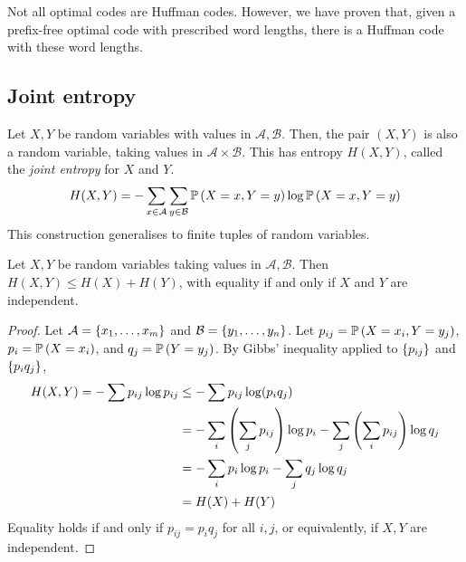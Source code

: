 \begin{remark}
    Not all optimal codes are Huffman codes.
    However, we have proven that, given a prefix-free optimal code with prescribed word lengths, there is a Huffman code with these word lengths.
\end{remark}

\subsection{Joint entropy}
Let \( X, Y \) be random variables with values in \( \mathcal A, \mathcal B \).
Then, the pair \( (X, Y) \) is also a random variable, taking values in \( \mathcal A \times \mathcal B \).
This has entropy \( H(X,Y) \), called the \emph{joint entropy} for \( X \) and \( Y \).
\[ H(X,Y) = - \sum_{x \in \mathcal A} \sum_{y \in \mathcal B} \mathbb{P}\left({X = x, Y = y}\right) \log \mathbb{P}\left({X = x, Y = y}\right) \]
This construction generalises to finite tuples of random variables.
\begin{lemma}
    Let \( X, Y \) be random variables taking values in \( \mathcal A, \mathcal B \).
    Then \( H(X,Y) \leq H(X) + H(Y) \), with equality if and only if \( X \) and \( Y \) are independent.
\end{lemma}
\begin{proof}
    Let \( \mathcal A = \qty{x_1, \dots, x_m} \) and \( \mathcal B = \qty{y_1, \dots, y_n} \).
    Let \( p_{ij} = \mathbb{P}\left({X = x_i, Y = y_j}\right) \), \( p_i = \mathbb{P}\left({X = x_i}\right) \), and \( q_j = \mathbb{P}\left({Y = y_j}\right) \).
    By Gibbs' inequality applied to \( \qty{p_{ij}} \) and \( \qty{p_i q_j} \),
    \begin{align*}
        H(X,Y) = -\sum p_{ij} \log p_{ij} &\leq -\sum p_{ij} \log(p_i q_j) \\
        &= -\sum_i \qty(\sum_j p_{ij}) \log p_i - \sum_j \qty(\sum_i p_{ij}) \log q_j \\
        &= -\sum_i p_i \log p_i - \sum_j q_j \log q_j \\
        &= H(X) + H(Y)
    \end{align*}
    Equality holds if and only if \( p_{ij} = p_i q_j \) for all \( i, j \), or equivalently, if \( X, Y \) are independent.
\end{proof}
